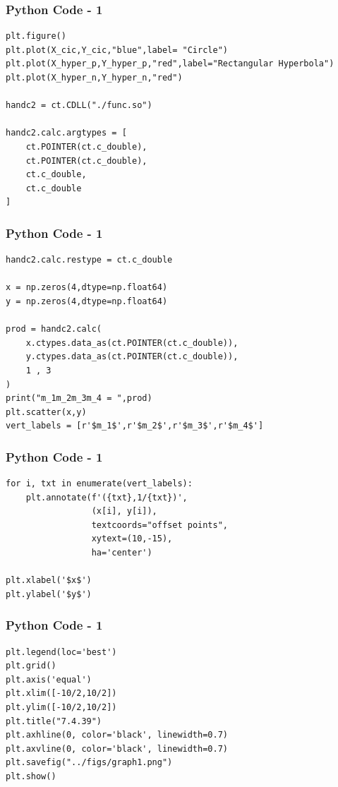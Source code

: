 \documentclass{beamer}
\begin{document}
\begin{frame}[fragile]
    \frametitle{Python Code - 1}
    \begin{lstlisting}
plt.figure()
plt.plot(X_cic,Y_cic,"blue",label= "Circle")
plt.plot(X_hyper_p,Y_hyper_p,"red",label="Rectangular Hyperbola")
plt.plot(X_hyper_n,Y_hyper_n,"red")

handc2 = ct.CDLL("./func.so")

handc2.calc.argtypes = [
    ct.POINTER(ct.c_double),
    ct.POINTER(ct.c_double),
    ct.c_double,
    ct.c_double
]
\end{lstlisting}
\end{frame}


\begin{frame}[fragile]
    \frametitle{Python Code - 1}
    \begin{lstlisting}
handc2.calc.restype = ct.c_double

x = np.zeros(4,dtype=np.float64)
y = np.zeros(4,dtype=np.float64)

prod = handc2.calc(
    x.ctypes.data_as(ct.POINTER(ct.c_double)),
    y.ctypes.data_as(ct.POINTER(ct.c_double)),
    1 , 3
)
print("m_1m_2m_3m_4 = ",prod)
plt.scatter(x,y)
vert_labels = [r'$m_1$',r'$m_2$',r'$m_3$',r'$m_4$']

\end{lstlisting}
\end{frame}

\begin{frame}[fragile]
    \frametitle{Python Code - 1}
    \begin{lstlisting}
for i, txt in enumerate(vert_labels):
    plt.annotate(f'({txt},1/{txt})',
                 (x[i], y[i]),
                 textcoords="offset points",
                 xytext=(10,-15),
                 ha='center')

plt.xlabel('$x$')
plt.ylabel('$y$')
\end{lstlisting}
\end{frame}


\begin{frame}[fragile]
    \frametitle{Python Code - 1}
    \begin{lstlisting}
plt.legend(loc='best')
plt.grid() 
plt.axis('equal')
plt.xlim([-10/2,10/2])
plt.ylim([-10/2,10/2])
plt.title("7.4.39")
plt.axhline(0, color='black', linewidth=0.7)
plt.axvline(0, color='black', linewidth=0.7)
plt.savefig("../figs/graph1.png")
plt.show()


\end{lstlisting}
\end{frame}
\end{document}
